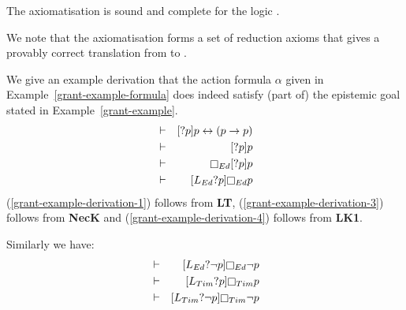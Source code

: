 \begin{theorem}\label{afl-k-axioms-completeness}
The axiomatisation \axiomAflK{} is sound and complete for the logic \logicAflK{}.
\end{theorem}

We note that the axiomatisation \axiomAflK{} forms a set of reduction axioms that gives a provably correct translation from \langAfl{} to \lang{}.

\begin{example}\label{grant-example-derivation}
We give an example derivation that the action formula $\alpha$ given in Example~\ref{grant-example-formula} does indeed satisfy (part of) the epistemic goal stated in Example~\ref{grant-example}.
\begin{eqnarray}
    &\proves& \actionA{\test{\atomP}} \atomP \iff (\atomP \implies \atomP)\label{grant-example-derivation-1}\\
    &\proves& \actionA{\test{\atomP}} \atomP\label{grant-example-derivation-2}\\
    &\proves& \necessary[Ed] \actionA{\test{\atomP}} \atomP\label{grant-example-derivation-3}\\
    &\proves& \actionA{\learns[Ed] \test{\atomP}} \necessary[Ed] \atomP\label{grant-example-derivation-4}
\end{eqnarray}
(\ref{grant-example-derivation-1}) follows from {\bf LT},
(\ref{grant-example-derivation-3}) follows from {\bf NecK} and
(\ref{grant-example-derivation-4}) follows from {\bf LK1}.

Similarly we have:
\begin{eqnarray*}
    &\proves& \actionA{\learns[Ed] \test{\neg \atomP}} \necessary[Ed] \neg \atomP\\
    &\proves& \actionA{\learns[Tim] \test{\atomP}} \necessary[Tim] \atomP\\
    &\proves& \actionA{\learns[Tim] \test{\neg \atomP}} \necessary[Tim] \neg \atomP
\end{eqnarray*}


\end{example}
